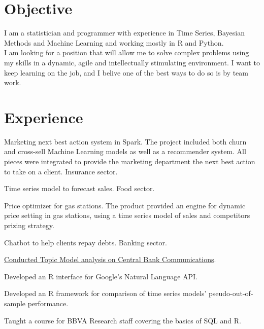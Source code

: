 \documentclass[]{deedy-resume-openfont}
\begin{document}
\begin{minipage}[t]{0.66\textwidth} 


\section{Objective}
I am a statistician and programmer with experience in Time Series, Bayesian Methods and Machine Learning and working
mostly in R and Python.\\
I am looking for a position that will allow me to solve complex problems using my skills in a dynamic, agile and 
intellectually stimulating environment. I want to keep learning on the job, and I belive one of the best ways
to do so is by team work.  
\sectionsep


\section{Experience}

\vspace{\topsep} %
\begin{tightemize}
\item Marketing next best action system in Spark. The project included both churn and cross-sell Machine Learning
models as well as a recommender system. All pieces were integrated to provide the marketing department the next
best action to take on a client.
Insurance sector.
\item Time series model to forecast sales. Food sector.
\item Price optimizer for gas stations. The product provided an engine for dynamic price setting in gas stations,
using a time series model of sales and competitors prizing strategy.
\item Chatbot to help clients repay debts. Banking sector.
\end{tightemize}
\sectionsep

\begin{tightemize}
\item \href{
https://www.bbvaresearch.com/en/publicaciones/how-do-the-emerging-markets-central-bank-talk-a-big-data-approach-to-the-cb-of-turkey/
}
  {Conducted Topic Model analysis on Central Bank Communications}. 
\item Developed an R interface for Google's Natural Language API.
\item Developed an R framework for comparison of time series models' 
  pseudo-out-of-sample performance.
\item Taught a course for BBVA Research staff covering the basics of SQL and R.
\end{tightemize}
\sectionsep


\end{minipage}
\end{document}
